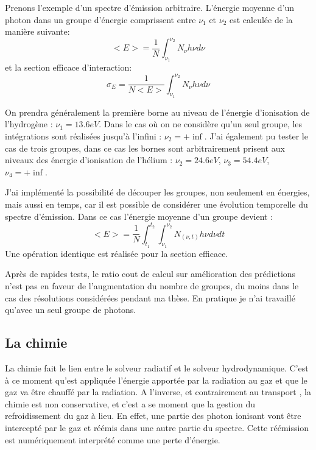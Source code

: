 Prenons l'exemple d'un spectre d'émission arbitraire.
L’énergie moyenne d'un photon dans un groupe d'énergie comprissent entre $\nu_1$ et $\nu_2$ est calculée de la manière suivante:
\begin{equation}
<E> = \frac{1}{N} \int_{\nu_1}^{\nu_2} N_\nu h \nu d\nu
\end{equation}
et la section efficace d'interaction:
\begin{equation}
\sigma_E = \frac{1}{N<E>} \int_{\nu_1}^{\nu_2} N_\nu h \nu d\nu
\end{equation}

On prendra généralement la première borne au niveau de l'énergie d'ionisation de l'hydrogène : $\nu_1=13.6eV$.
Dans le cas où on ne considère qu'un seul groupe, les intégrations sont réalisées jusqu'à l'infini : $\nu_2= + \inf$.
J'ai également pu tester le cas de trois groupes, dans ce cas les bornes sont arbitrairement prisent aux niveaux des énergie d'ionisation de l'hélium : 
$\nu_2= 24.6 eV$, $\nu_3= 54.4 eV $, $\nu_4= + \inf$.

J'ai implémenté la possibilité de découper les groupes, non seulement en énergies, mais aussi en temps, car il est possible de considérer une évolution temporelle du spectre d'émission.
Dans ce cas l'énergie moyenne d'un groupe devient : 
\begin{equation}
<E> = \frac{1}{N}  \int_{t_1}^{t_2}  \int_{\nu_1}^{\nu_2} N_{(\nu,t)} h \nu d\nu dt
\end{equation}
Une opération identique est réalisée pour la section efficace.

Après de rapides tests, le ratio cout de calcul sur amélioration des prédictions n'est pas en faveur de l'augmentation du nombre de groupes, du moins dans le cas des résolutions considérées pendant ma thèse.
En pratique je n'ai travaillé qu'avec un seul groupe de photons.

\subsection{La chimie}
\label{sec:chimie}

La chimie fait le lien entre le solveur radiatif et le solveur hydrodynamique.
C'est à ce moment qu'est appliquée l'énergie apportée par la radiation au gaz et que le gaz va être chauffé par la radiation.
A l'inverse, et contrairement au transport , la chimie est non conservative, et c'est a se moment que la gestion du refroidissement du gaz à lieu.
En effet, une partie des photon ionisant vont être intercepté par le gaz et réémis dans une autre partie du spectre.
Cette réémission est numériquement interprété comme une perte d'énergie.

